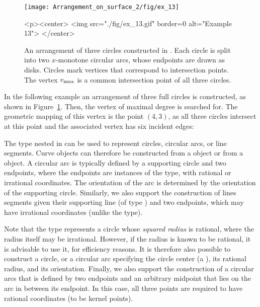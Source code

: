 \begin{figure}[t]
\begin{ccTexOnly}
  \begin{center}
  \texttt{[image: Arrangement\_on\_surface\_2/fig/ex\_13]}
  \end{center}
\end{ccTexOnly}
\begin{ccHtmlOnly}
  <p><center>
  <img src="./fig/ex_13.gif" border=0 alt="Example 13">
  </center>
\end{ccHtmlOnly}
\caption{An arrangement of three circles constructed in
. Each circle is split into two $x$-monotone
circular arcs, whose endpoints are drawn as disks. Circles
mark vertices that correspond to intersection points. The vertex
$v_{\rm max}$ is a common intersection point of all three
circles.\label{arr_fig:ex_13}}
\end{figure}

In the following example an arrangement of three full circles is
constructed, as shown in Figure~\ref{arr_fig:ex_13}. Then, the vertex
of maximal degree is searched for. The geometric mapping of this
vertex is the point $(4,3)$, as all three circles intersect at this point
and the associated vertex has six incident edges:


The  type nested in  can be
used to represent circles, circular arcs, or line segments. Curve objects
can therefore be constructed from a  object or from
a  object. A circular arc is typically defined by
a supporting circle and two endpoints, where the endpoints are instances
of the  type, with rational or irrational coordinates. The
orientation of the arc is determined by the orientation of the supporting
circle. Similarly, we also support the construction of lines segments given
their supporting line (of type ) and two endpoints, which
may have irrational coordinates (unlike the  type).

Note that the  type represents a circle whose
\emph{squared radius} is rational, where the radius itself may be irrational.
However, if the radius is known to be rational, it is advisable to use it,
for efficiency reasons. It is therefore also possible to construct a circle,
or a circular arc specifying the circle center (a ), its
rational radius, and its orientation. Finally, we also support the construction
of a circular arcs that is defined by two endpoints and an arbitrary midpoint
that lies on the arc in between its endpoint. In this case, all three points
are required to have rational coordinates (to be kernel points).

